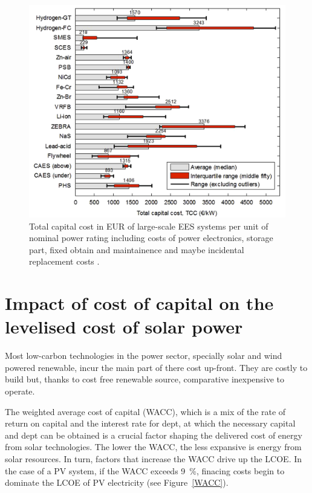 \begin{figure}[htbp]  
\centering
\includegraphics[width=0.65\linewidth]{FIG/TCC_EES}
\caption[Total capital cost in EUR of large-scale EES systems per unit of nominal power rating including costs of power electronics, storage part, fixed obtain and maintainence and maybe incidental replacement costs.]{Total capital cost in EUR of large-scale EES systems per unit of nominal power rating including costs of power electronics, storage part, fixed obtain and maintainence and maybe incidental replacement costs \cite{Zakeri2015}.}\label{TCC_EES}
\end{figure}
\section{Impact of cost of capital on the levelised cost of solar power}
Most low-carbon technologies in the power sector, specially solar and wind powered renewable, incur the main part of there cost up-front. They are costly to build but, thanks to cost free renewable source, comparative inexpensive to operate.

The weighted average cost of capital (WACC), which is a mix of the  rate of return on capital and the interest rate for dept, at which the necessary capital and dept can be obtained is a crucial factor shaping the delivered cost of energy from solar technologies. The lower the WACC, the less expansive is energy from solar resources. In turn, factors that increase the WACC drive up the LCOE. In the case of a PV system, if the WACC exceeds \SI{9}{\percent}, finacing costs begin to dominate the LCOE of PV electricity (see Figure~\ref{WACC}). 

